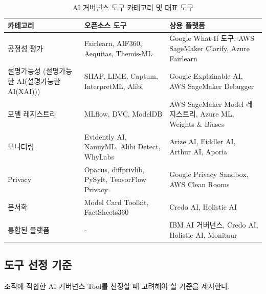\begin{table}[htbp]
\centering
\caption{AI 거버넌스 도구 카테고리 및 대표 도구}
\label{tab:tool_categories}
\begin{tabularx}{\textwidth}{p{2.5cm}p{4cm}X}
\toprule
\textbf{카테고리} & \textbf{오픈소스 도구} & \textbf{상용 플랫폼} \\
\midrule
공정성 평가 & 
Fairlearn\cite{mehrabi2021survey}, AIF360\cite{saleiro2018aequitas}, Aequitas, Themis-ML & 
Google What-If 도구, AWS SageMaker Clarify, Azure Fairlearn \\
\midrule
설명가능성\cite{arrieta2020explainable} (설명가능한 AI(설명가능한 AI(XAI))) & 
SHAP\cite{lundberg2017unified}, LIME, Captum\cite{sokol2020explainability}, InterpretML, Alibi & 
Google Explainable AI, AWS SageMaker Debugger \\
\midrule
모델 레지스트리 & 
MLflow\cite{zaharia2018accelerating}, DVC, ModelDB & 
AWS SageMaker Model 레지스트리, Azure ML, Weights \& Biases \\
\midrule
모니터링 & 
Evidently\cite{sculley2015hidden} AI, NannyML, Alibi Detect, WhyLabs & 
Arize AI, Fiddler AI, Arthur AI, Aporia \\
\midrule
Privacy & 
Opacus, diffprivlib, PySyft, TensorFlow Privacy & 
Google Privacy Sandbox, AWS Clean Rooms \\
\midrule
문서화\cite{arnold2019factsheets} & 
Model Card\cite{gebru2021datasheets} Toolkit, FactSheets360 & 
Credo AI, Holistic AI \\
\midrule
통합된 플랫폼 & 
- & 
IBM AI 거버넌스, Credo AI, Holistic AI, Monitaur \\
\bottomrule
\end{tabularx}
\end{table}


\subsection{도구 선정 기준}
\label{sec:6.1.3}

조직에 적합한 AI 거버넌스 Tool를 선정할 때 고려해야 할 기준을 제시한다.

